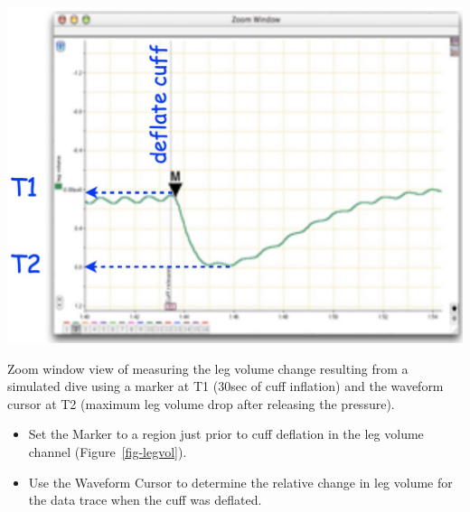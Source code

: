 \documentclass[
  letterpaper,
  DIV=11,
  numbers=noendperiod,
  oneside]{scrartcl}
\providecommand{\tightlist}{%
  \setlength{\itemsep}{0pt}\setlength{\parskip}{0pt}}\usepackage{longtable,booktabs,array}
\begin{document}
\begin{marginfigure}

{\centering \includegraphics{../../images/legvol.jpg}

}

\caption{\label{fig-legvol}Zoom window view of measuring the leg volume
change resulting from a simulated dive using a marker at T1 (30sec of
cuff inflation) and the waveform cursor at T2 (maximum leg volume drop
after releasing the pressure).}

\end{marginfigure}

\begin{tcolorbox}[enhanced jigsaw, arc=.35mm, leftrule=.75mm, coltitle=black, left=2mm, rightrule=.15mm, colbacktitle=quarto-callout-tip-color!10!white, opacitybacktitle=0.6, breakable, titlerule=0mm, colback=white, bottomrule=.15mm, toprule=.15mm, opacityback=0, colframe=quarto-callout-tip-color-frame, toptitle=1mm, title=\textcolor{quarto-callout-tip-color}{\faLightbulb}\hspace{0.5em}{Measuring leg volume from the volume trace:}, bottomtitle=1mm]

\begin{itemize}
\tightlist
\item
  Set the Marker to a region just prior to cuff deflation in the leg
  volume channel (Figure~\ref{fig-legvol}).
\item
  Use the Waveform Cursor to determine the relative change in leg volume
  for the data trace when the cuff was deflated.
\end{itemize}

\end{tcolorbox}
\end{document}
